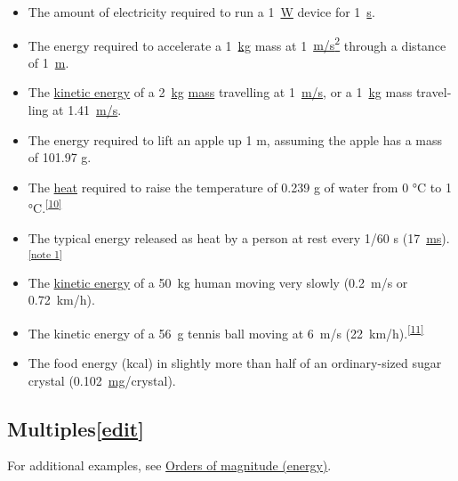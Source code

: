 \documentclass[
]{article}
\providecommand{\tightlist}{%
  \setlength{\itemsep}{0pt}\setlength{\parskip}{0pt}}
\newenvironment{LTR}{\beginL}{\endL}
\begin{document}
\begin{LTR}
\begin{otherlanguage}{english}
\begin{itemize}
\tightlist
\item
  The amount of electricity required to run a {{}1~\href{/wiki/Watt}{W}}
  device for {{}1~\href{/wiki/Second}{s}}.
\item
  The energy required to accelerate a {{}1~\href{/wiki/Kilogram}{kg}}
  mass at
  {{}1~\href{/wiki/Metre_per_second_squared}{m/s\textsuperscript{2}}}
  through a distance of {{}1~\href{/wiki/Metre}{m}}.
\item
  The \href{/wiki/Kinetic_energy}{kinetic energy} of a
  {{}2~\href{/wiki/Kilogram}{kg}} \href{/wiki/Mass}{mass} travelling at
  {{}1~\href{/wiki/Metre_per_second}{m/s}}, or a
  {{}1~\href{/wiki/Kilogram}{kg}} mass travelling at
  {{}1.41~\href{/wiki/Metre_per_second}{m/s}}.
\item
  The energy required to lift an apple up 1 m, assuming the apple has a
  mass of 101.97 g.
\item
  The \href{/wiki/Heat}{heat} required to raise the temperature of 0.239
  g of water from 0 °C to 1
  °C.\textsuperscript{\hyperref[cite_note-10]{{[}10{]}}}
\item
  The typical energy released as heat by a person at rest every 1/60 s
  ({{}17~\href{/wiki/Millisecond}{ms}}).\textsuperscript{\hyperref[cite_note-11]{{[}note
  1{]}}}
\item
  The \href{/wiki/Kinetic_energy}{kinetic energy} of a {{}50~kg} human
  moving very slowly (0.2~m/s or 0.72~km/h).
\item
  The kinetic energy of a {{}56~g} tennis ball moving at 6~m/s
  (22~km/h).\textsuperscript{\hyperref[cite_note-12]{{[}11{]}}}
\item
  The food energy (kcal) in slightly more than half of an ordinary-sized
  sugar crystal ({{}0.102~\href{/wiki/Milligram}{mg}}/crystal).
\end{itemize}

\subsection[{{{[}}\href{/w/index.php?title=Joule&action=edit&section=4}{{edit}}{{]}}}]{\texorpdfstring{\label{Multiples}{Multiples}{{{[}}\href{/w/index.php?title=Joule&action=edit&section=4}{{edit}}{{]}}}}{Multiples{[}edit{]}}}\label{multiplesedit}

For additional examples, see
\href{/wiki/Orders_of_magnitude_(energy)}{Orders of magnitude (energy)}.


\end{otherlanguage}
\end{LTR}
\end{document}
